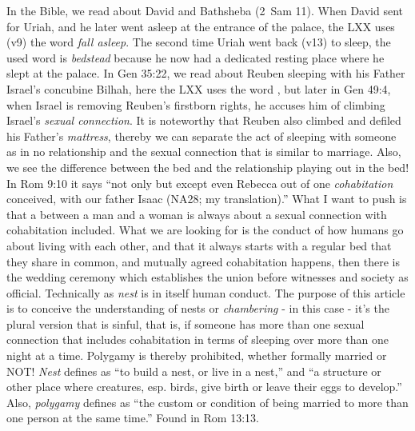 In the Bible, we read about David and Bathsheba (2~Sam 11). When David sent for Uriah, and he later went asleep at the entrance of the palace, the LXX uses (v9) the word  \emph{fall asleep}. The second time Uriah went back (v13) to sleep, the used word is  \emph{bedstead} because he now had a dedicated resting place where he slept at the palace.
In Gen 35:22, we read about Reuben sleeping with his Father Israel's concubine Bilhah, here the LXX uses the word , but later in Gen 49:4, when Israel is removing Reuben's firstborn rights, he accuses him of climbing Israel's  \emph{sexual connection}. It is noteworthy that Reuben also climbed and defiled his Father's  \emph{mattress}, thereby we can separate the act of sleeping with someone as in no relationship and the sexual connection that is similar to marriage. Also, we see the difference between the bed and the relationship playing out in the bed!
In Rom 9:10 it says ``not only but except even Rebecca out of one \emph{cohabitation} conceived, with our father Isaac (NA28; my translation).'' What I want to push is that a  between a man and a woman is always about a sexual connection with cohabitation included. What we are looking for is the conduct of how humans go about living with each other, and that it always starts with a regular bed that they share in common, and mutually agreed cohabitation happens, then there is the wedding ceremony which establishes the union before witnesses and society as official.
 Technically  as \emph{nest} is in itself human conduct. The purpose of this article is to conceive the understanding of nests or \emph{chambering} - in this case - it's the plural version that is sinful, that is, if someone has more than one sexual connection that includes cohabitation in terms of sleeping over more than one night at a time. Polygamy is thereby prohibited, whether formally married or NOT!
\emph{Nest} defines as ``to build a nest, or live in a nest,'' and ``a structure or other place where creatures, esp. birds, give birth or leave their eggs to develop.'' Also, \emph{polygamy} defines as ``the custom or condition of being married to more than one person at the same time.''
Found in Rom 13:13.
